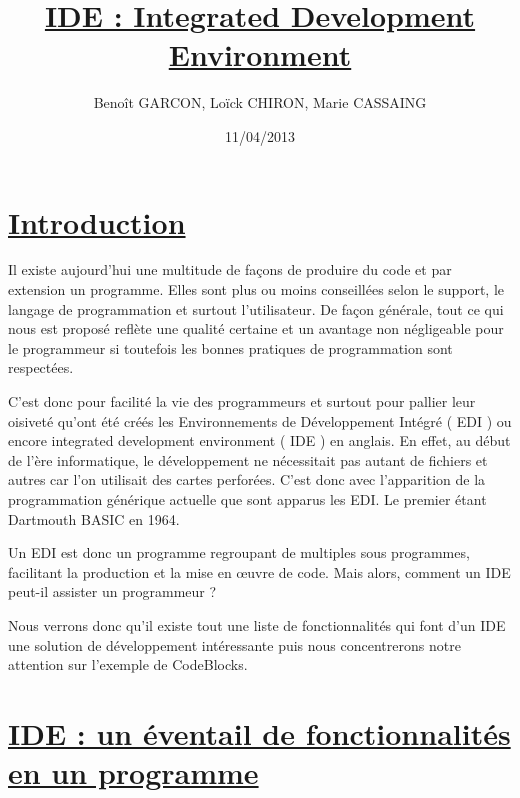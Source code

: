 \documentclass[a4paper, 12pt]{article}
\title{\underline{\textbf{IDE : Integrated Development Environment}}}
\author{Benoît GARCON, Loïck CHIRON, Marie CASSAING}
\date{11/04/2013}
\begin{document}
\pagecolor{bleuciel}

\maketitle \vspace {4cm} \thispagestyle{empty}

\newpage \tableofcontents \thispagestyle{empty}
\pagecolor{blanc}

\newpage \section*{\underline{Introduction}} 

\begin{doublespace}


	Il existe aujourd'hui une multitude de façons de produire du code et par extension un programme. Elles sont plus ou moins conseillées selon le support, le langage de programmation et surtout l'utilisateur. De façon générale, tout ce qui nous est proposé reflète une qualité certaine et un avantage non négligeable pour le programmeur si toutefois les bonnes pratiques de programmation sont respectées.

	C'est donc pour facilité la vie des programmeurs et surtout pour pallier leur oisiveté qu'ont été créés les Environnements de Développement Intégré ( EDI ) ou encore integrated development environment ( IDE ) en anglais. En effet, au début de l'ère informatique, le développement ne nécessitait pas autant de fichiers et autres car l'on utilisait des cartes perforées. C'est donc avec l'apparition de la programmation générique actuelle que sont apparus les EDI. Le premier étant Dartmouth BASIC en 1964.

	Un EDI est donc un programme regroupant de multiples sous programmes, facilitant la production et la mise en œuvre de code. Mais alors, comment un IDE peut-il assister un programmeur ?

	Nous verrons donc qu'il existe tout une liste de fonctionnalités qui font d'un IDE une solution de développement intéressante puis nous concentrerons notre attention sur l'exemple de CodeBlocks.
\end{doublespace}

\newpage \section{\underline{IDE : un éventail de fonctionnalités en un programme}}
\end{document}
